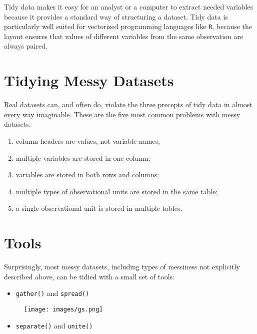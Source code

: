 \documentclass[]{book}
\providecommand{\tightlist}{%
  \setlength{\itemsep}{0pt}\setlength{\parskip}{0pt}}
\def\tightlist{}
\begin{document}
Tidy data makes it easy for an analyst or a computer to extract needed
variables because it provides a standard way of structuring a dataset.
Tidy data is particularly well suited for vectorized programming
languages like \texttt{R}, because the layout ensures that values of
different variables from the same observation are always paired.

\section{Tidying Messy Datasets}\label{tidying-messy-datasets}

Real datasets can, and often do, violate the three precepts of tidy data
in almost every way imaginable. These are the five most common problems
with messy datasets:

\begin{enumerate}
\def\labelenumi{\arabic{enumi}.}
\tightlist
\item
  column headers are values, not variable names;
\item
  multiple variables are stored in one column;
\item
  variables are stored in both rows and columns;
\item
  multiple types of observational units are stored in the same table;
\item
  a single observational unit is stored in multiple tables.
\end{enumerate}

\section{Tools}\label{tools}

Surprisingly, most messy datasets, including types of messiness not
explicitly described above, can be tidied with a small set of tools:

\begin{itemize}
\tightlist
\item
  \texttt{gather()} and \texttt{spread()}
\end{itemize}

\begin{figure}[htbp]
\centering
\texttt{[image: images/gs.png]}
\caption{}
\end{figure}

\clearpage

\begin{itemize}
\tightlist
\item
  \texttt{separate()} and \texttt{unite()}
\end{itemize}
\end{document}
